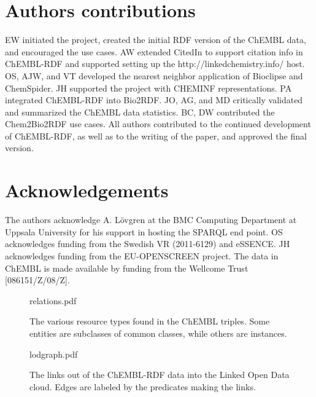 \documentclass[10pt]{bmc_article}
\newenvironment{bmcformat}{\begin{raggedright}\baselineskip20pt\sloppy\setboolean{publ}{false}}{\end{raggedright}\baselineskip20pt\sloppy}
\begin{document}
\begin{bmcformat}
\section*{Authors contributions}
EW initiated the project, created the initial RDF version of the ChEMBL data, and encouraged the use cases.
AW extended CitedIn to support citation info in ChEMBL-RDF and supported setting up the http://linkedchemistry.info/ host.
OS, AJW, and VT developed the nearest neighbor application of Bioclipse and ChemSpider.
JH supported the project with CHEMINF representations. PA integrated ChEMBL-RDF into Bio2RDF.
JO, AG, and MD critically validated and summarized the ChEMBL data statistics.
BC, DW contributed the Chem2Bio2RDF use cases.
All authors contributed to the continued development of ChEMBL-RDF, as well as to the writing of the paper,
and approved the final version.

\section*{Acknowledgements}

The authors acknowledge A. L\"ovgren at the BMC Computing Department at Uppsala University for his
support in hosting the SPARQL end point. OS acknowledges funding from the Swedish VR (2011-6129) and eSSENCE. 
JH acknowledges funding from the EU-OPENSCREEN project. 
The data in ChEMBL is made available by funding from the Wellcome Trust [086151/Z/08/Z].

{
  
}


\newpage

\begin{figure}[t]
\begin{center}
relations.pdf
\caption{The various resource types found in the ChEMBL triples. Some entities are subclasses
of common classes, while others are instances.}\label{f1}
\end{center}
\end{figure}

\begin{figure}[t]
{\center
lodgraph.pdf
\caption{The links out of the ChEMBL-RDF data into the Linked Open Data cloud.
Edges are labeled by the predicates making the links.}\label{2}
}
\end{figure}


\end{bmcformat}
\end{document}
